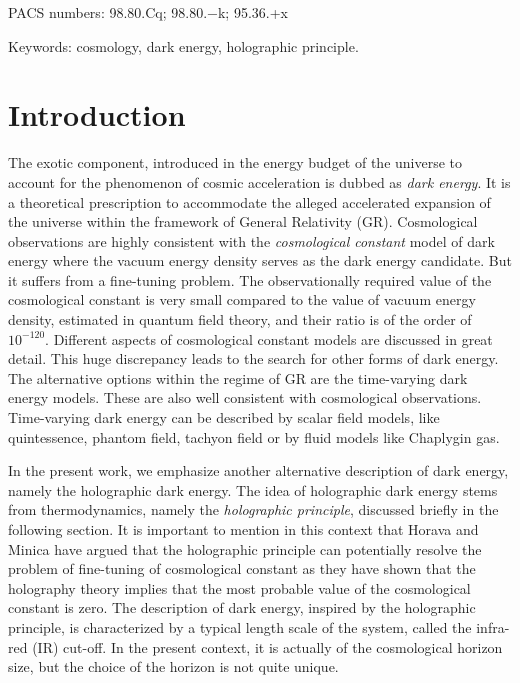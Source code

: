 \documentclass[11pt]{article}
\begin{document}
\vskip 1.0cm

PACS numbers: 98.80.Cq; 98.80.−k; 95.36.+x

Keywords: cosmology, dark energy, holographic principle. 





\section{Introduction}
The exotic component, introduced in the energy budget of the universe to account for the phenomenon of cosmic acceleration is dubbed as {\it dark energy}. It is a theoretical prescription to accommodate the alleged accelerated expansion of the universe within the framework of General Relativity (GR). Cosmological observations are highly consistent with the {\it cosmological constant} model of dark energy where the vacuum energy density serves as the dark energy candidate. But it suffers from a fine-tuning problem. The observationally required value of the cosmological constant is very small compared to the value of vacuum energy density, estimated in quantum field theory, and their ratio is of the order of $10^{-120}$. Different aspects of cosmological constant models are discussed in great detail\cite{carrol, pady}. This huge discrepancy leads to the search for other forms of dark energy. The alternative options within the regime of GR are the time-varying dark energy models. These are also well consistent with cosmological observations. Time-varying dark energy can be described by scalar field models, like quintessence\cite{quint}, phantom field\cite{phantom}, tachyon field\cite{tachyon} or by fluid models like Chaplygin gas\cite{chap}.

\par In the present work, we emphasize another alternative description of dark energy, namely the holographic dark energy. The idea of holographic dark energy stems from thermodynamics, namely the {\it holographic principle}, discussed briefly in the following section. It is important to mention in this context that Horava and Minica\cite{harami} have argued that the holographic principle can potentially resolve the problem of fine-tuning of cosmological constant as they have shown that the holography theory implies that the most probable value of the cosmological constant is zero. The description of dark energy, inspired by the holographic principle, is characterized by a typical length scale of the system, called the infra-red (IR) cut-off. In the present context, it is actually of the cosmological horizon size, but the choice of the horizon is not quite unique.
\end{document}
